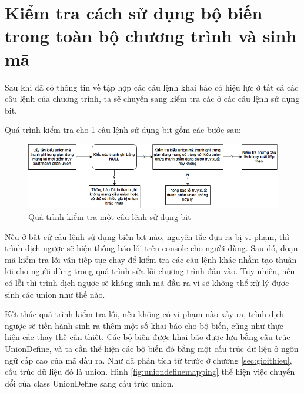 \section{Kiểm tra cách sử dụng bộ biến trong toàn bộ chương trình và sinh mã}

\label{sec:laststep}
Sau khi đã có thông tin về tập hợp các câu lệnh khai báo có hiệu lực ở tất cả các câu lệnh của chương trình, ta sẽ chuyển sang kiểm tra các ở các câu lệnh sử dụng bit.

Quá trình kiểm tra cho 1 câu lệnh sử dụng bit gồm các bước sau:

\begin{figure}
	\centering
	\includegraphics[width=0.7\linewidth]{image/checkUnionSteps}
	\caption{Quá trình kiểm tra một câu lệnh sử dụng bit}
	\label{fig:checkunionsteps}
\end{figure}

Nếu ở bất cứ câu lệnh sử dụng biến bit nào, nguyên tắc đưa ra bị vi phạm, thì trình dịch ngược sẽ hiện thông báo lỗi trên console cho người dùng. Sau đó, đoạn mã kiểm tra lỗi vẫn tiếp tục chạy để kiểm tra các câu lệnh khác nhằm tạo thuận lợi cho người dùng trong quá trình sửa lỗi chương trình đầu vào. Tuy nhiên, nếu có lỗi thì trình dịch ngược sẽ không sinh mã đầu ra vì sẽ không thể xử lý được sinh các union như thế nào.


Kết thúc quá trình kiểm tra lỗi, nếu không có vi phạm nào xảy ra, trình dịch ngược sẽ tiến hành sinh ra thêm một số khai báo cho bộ biến, cũng như thực hiện các thay thế cần thiết. Các bộ biến được khai báo được lưu bằng cấu trúc UnionDefine, và ta cần thể hiện các bộ biến đó bằng một cấu trúc dữ liệu ở ngôn ngữ cấp cao của mã đầu ra. Như đã phân tích từ trước ở chương \ref{sec:gioithieu}, cấu trúc dữ liệu đó là union. Hình \ref{fig:uniondefinemapping} thể hiện việc chuyển đổi của class UnionDefine sang cấu trúc union.

